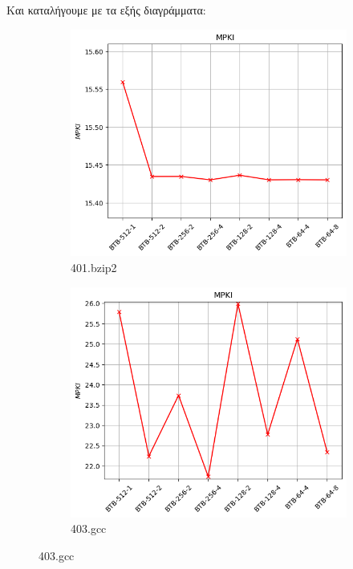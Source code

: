 \documentclass{article}
\begin{document}
Και καταλήγουμε με τα εξής διαγράμματα:
\begin{figure}[H]
    \centering

    \begin{subfigure}[b]{0.45\textwidth}
        \includegraphics[width=\textwidth]{figures/5_4/401.bzip2.cslab_branch_preds_ref.out.png}
        \caption{401.bzip2}
        \label{fig:plot49}
    \end{subfigure}
    \hfill
    \begin{subfigure}[b]{0.45\textwidth}
        \includegraphics[width=\textwidth]{figures/5_4/403.gcc.cslab_branch_preds_ref.out.png}
        \caption{403.gcc}
        \label{fig:plot50}
    \end{subfigure}


\end{figure}
\end{document}
